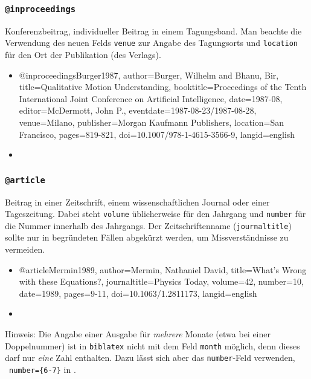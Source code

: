 
\subsubsection{\texttt{\bfseries @inproceedings}}
\label{sec:@inproceedings}

Konferenzbeitrag, individueller Beitrag in einem Tagungsband. Man beachte die
Verwendung des neuen Felds \texttt{venue} zur Angabe des Tagungsorts und
\texttt{location} für den Ort der Publikation (des Verlags).
%
\begin{itemize}
\item[]
\begin{GenericCode}[numbers=none]
@inproceedings{Burger1987,
  author={Burger, Wilhelm and Bhanu, Bir},
  title={Qualitative Motion Understanding},
  booktitle={Proceedings of the Tenth International Joint Conference on Artificial Intelligence},
  date={1987-08},
  editor={McDermott, John P.},
  eventdate={1987-08-23/1987-08-28},
  venue={Milano},
  publisher={Morgan Kaufmann Publishers},
  location={San Francisco},
  pages={819-821},
  doi={10.1007/978-1-4615-3566-9},
  langid={english}
}
\end{GenericCode}
\item[\cite{Burger1987}] 
\end{itemize}


\subsubsection{\texttt{\bfseries @article}}
\label{sec:@article}

Beitrag in einer Zeitschrift, einem wissenschaftlichen Journal oder einer
Tageszeitung. Dabei steht \texttt{volume} üblicherweise für den Jahrgang und
\texttt{number} für die Nummer innerhalb des Jahrgangs. Der Zeitschriftenname
(\texttt{journaltitle}) sollte nur in begründeten Fällen abgekürzt werden, um
Missverständnisse zu vermeiden.
%
\begin{itemize}
\item[]
\begin{GenericCode}[numbers=none]
@article{Mermin1989,
  author={Mermin, Nathaniel David},
  title={What's Wrong with these Equations?},
  journaltitle={Physics Today},
  volume={42},
  number={10},
  date={1989},
  pages={9-11},
  doi={10.1063/1.2811173},
  langid={english}
}
\end{GenericCode}
\item[\cite{Mermin1989}] 
\end{itemize}
%
Hinweis: Die Angabe einer Ausgabe für \emph{mehrere} Monate (etwa bei
einer Doppelnummer) ist in \texttt{biblatex} nicht mit dem Feld
\texttt{month} möglich, denn dieses darf nur \emph{eine} Zahl enthalten. Dazu
lässt sich aber das \texttt{number}-Feld verwenden, \zB\
\texttt{number=\{6-7\}} in \cite{Vardavoulia2001}.

